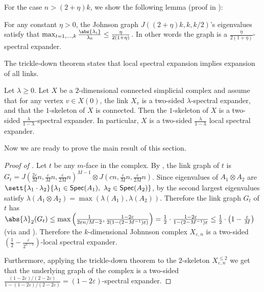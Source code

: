 For the case $n> (2+\eta)k$, we show the following lemma (proof in ):
\begin{lemma}\label{lem:Johnson-eigval-g2k}
     For any constant $\eta > 0$, the Johnson graph $J((2+\eta)k,k,k/2)$'s eigenvalues satisfy that $\max_{t=1,\dots,k}\frac{\abs{\lambda_i}}{\lambda_0} \le  \frac{\eta}{2(1+\eta)}
$. In other words the graph is a $\frac{\eta}{2(1+\eta)}$-spectral expander. 
\end{lemma}

The trickle-down theorem states that local spectral expansion implies expansion of all links. 
\begin{theorem} \label{thm:trickle-down}
    Let \(\lambda\geq 0\). Let \(X\) be a \(2\)-dimensional connected simplicial complex and assume that for any vertex \(v \in X(0)\), the link \(X_v\) is a two-sided \(\lambda\)-spectral expander, and that the $1$-skeleton of $X$ is connected. Then the $1$-skeleton of \(X\) is a two-sided \(\frac{\lambda}{1-\lambda}\)-spectral expander.
    In particular, \(X\) is a two-sided \(\frac{\lambda}{1-\lambda}\) local spectral expander.
\end{theorem}
Now we are ready to prove the main result of this section.
\begin{proof}[Proof of ]
    Let $t$ be any $m$-face in the complex. By , the link graph of $t$ is \(G_t = J(\frac{2\varepsilon}{M}n,\frac{\varepsilon}{M}n,\frac{\varepsilon}{2M}n)^{M-1} \otimes J(cn,\frac{\varepsilon}{M}n,\frac{\varepsilon}{2M}n)\).
    Since eigenvalues of $A_1\otimes A_2$ are $\sett{ \lambda_1\cdot\lambda_2 }{\lambda_1 \in  \mathsf{Spec}(A_1),~ \lambda_2 \in  \mathsf{Spec}(A_2)}$, 
    by  the second largest eigenvalues satisfy  $\lambda(A_1\otimes A_2) = \max (\lambda(A_1), \lambda(A_2))$. Therefore the link graph $G_t$ of $t$ has $\abs{\lambda}_2(G_t)  \le \max\left(\frac{1}{2\varepsilon n/M - 2}, \frac{1-2\varepsilon}{2(1-(2-M^{-1})\varepsilon)}\right) =\frac{1}{2}\cdot \frac{1-2\varepsilon}{1-(2-M^{-1})\varepsilon} \le \frac{1}{2}\cdot\left(1-\frac{\varepsilon}{M}\right)$ (via  and ). Therefore the $k$-dimensional Johnnson complex $X_{\varepsilon,n}$ is a two-sided $\left(\frac{1}{2}-\frac{\varepsilon}{2^{k-1}}\right)$-local spectral expander.

 Furthermore, applying the trickle-down theorem to the $2$-skeleton $X^{\le 2}_{\varepsilon,n}$ we get that the underlying graph of the complex is a two-sided $\frac{(1-2\varepsilon)/(2-2\varepsilon)}{1 - (1-2\varepsilon)/(2-2\varepsilon)} = (1-2\varepsilon)$-spectral expander. 
\end{proof}

